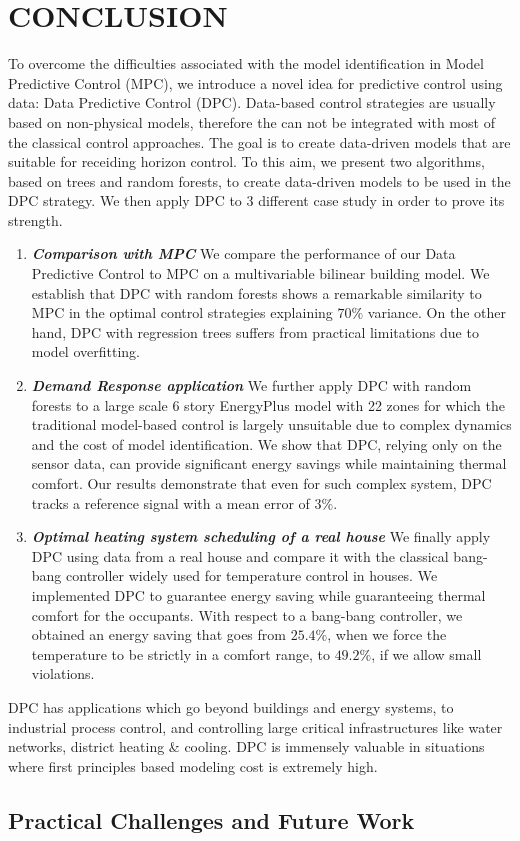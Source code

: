 \section{CONCLUSION}
\label{S:conclusion}

To overcome the difficulties associated with the model identification in Model Predictive Control (MPC), we introduce a novel idea for predictive control using data: Data Predictive Control (DPC). Data-based control strategies are usually based on non-physical models, therefore the can not be integrated with most of the classical control approaches. The goal is to create data-driven models that are suitable for receiding horizon control. To this aim, we present two algorithms, based on trees and random forests, to create data-driven models to be used in the DPC strategy. We then apply DPC to $3$ different case study in order to prove its strength.
\begin{enumerate}
\item \emph{\textbf{Comparison with MPC}} We compare the performance of our Data Predictive Control to MPC on a multivariable bilinear building model. We establish that DPC with random forests shows a remarkable similarity to MPC in the optimal control strategies explaining $70\%$ variance. On the other hand, DPC with regression trees suffers from practical limitations due to model overfitting.
\item \emph{\textbf{Demand Response application}} We further apply DPC with random forests to a large scale 6 story EnergyPlus model with 22 zones for which the traditional model-based control is largely unsuitable due to complex dynamics and the cost of model identification. We show that DPC, relying only on the sensor data, can provide significant energy savings while maintaining thermal comfort. Our results demonstrate that even for such complex system, DPC tracks a reference signal with a mean error of $3\%$.
\item \emph{\textbf{Optimal heating system scheduling of a real house}} We finally apply DPC using data from a real house and compare it with the classical bang-bang controller widely used for temperature control in houses. We implemented DPC to guarantee energy saving while guaranteeing thermal comfort for the occupants. With respect to a bang-bang controller, we obtained an energy saving that goes from $25.4\%$, when we force the temperature to be strictly in a comfort range, to $49.2\%$, if we allow small violations.
\end{enumerate}
DPC has applications which go beyond buildings and energy systems, to industrial process control, and controlling large critical infrastructures like water networks, district heating \& cooling. DPC is immensely valuable in situations where first principles based modeling cost is extremely high.

\subsection{Practical Challenges and Future Work}
\label{SS:challenges}
